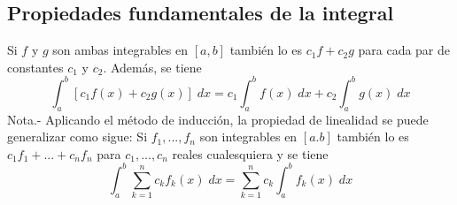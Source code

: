\begin{multicols}{2}
\section*{Propiedades fundamentales de la integral}

\begin{teo} Si $f$ y $g$ son ambas integrables en $[a,b]$ también lo es $c_1f+c_2g$ para cada par de constantes $c_1$ y $c_2$. Además, se tiene
    $$\int_a^b \left[c_1 f(x) + c_2g(x)\right]\; dx = c_1\int_a^b f(x) \; dx + c_2 \int_a^b g(x) \; dx$$
    Nota.- \; Aplicando el método de inducción, la propiedad de linealidad se puede generalizar como sigue: Si $f_1,...,f_n$ son integrables en $[a.b]$ también lo es $c_1f_1+...+c_nf_n$ para $c_1,...,c_n$ reales cualesquiera y se tiene $$\int_a^b \sum\limits_{k=1}^n c_kf_k(x)\; dx = \sum\limits_{k=1}^n c_k \int_a^b f_k(x)\; dx$$\\


\end{teo}
\end{multicols}
